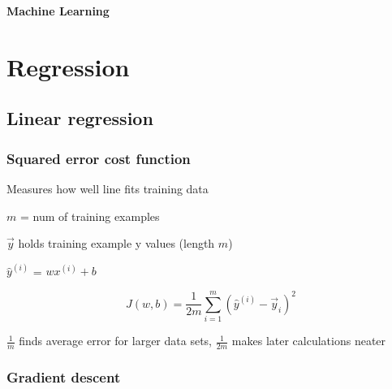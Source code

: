 \documentclass[12pt]{article}
\begin{document}
\newcommand*\dif{\mathop{}\!\mathrm{d}}

\newenvironment{myitemize}
{ \begin{itemize}
    \setlength{\itemsep}{0pt}
    \setlength{\parskip}{0pt}
    \setlength{\parsep}{0pt}     }
{ \end{itemize}                  } 

\newenvironment{myenumerate}
{ \begin{enumerate}
    \setlength{\itemsep}{0pt}
    \setlength{\parskip}{0pt}
    \setlength{\parsep}{0pt}     }
{ \end{enumerate}                  } 

\begin{titlepage}
\begin{center}
\vspace*{2cm}
\begin{huge}\textbf{Machine Learning}\end{huge}
\end{center}
\end{titlepage}

\tableofcontents


\pagebreak

\section{Regression}
\subsection{Linear regression}
\subsubsection{Squared error cost function}

Measures how well line fits training data

$m$ = num of training examples

$\vec{y}$ holds training example y values (length $m$)

${\hat y}^{(i)}$ = $wx^{(i)} + b$

\[ J(w,b) = \frac{1}{2m} \sum_{i=1}^m ({\hat y}^{(i)} - \vec{y}_i)^2 \]

$\frac{1}{m}$ finds average error for larger data sets, $\frac{1}{2m}$ makes later calculations neater

\subsubsection{Gradient descent}
\end{document}

